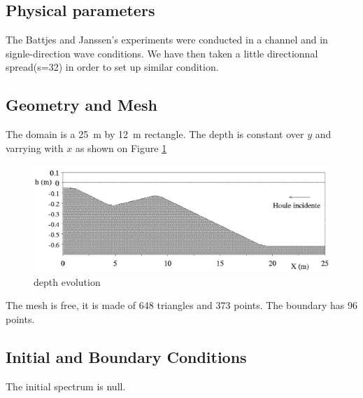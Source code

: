 %
%
%

%
%
\subsection{Physical parameters}
%
The Battjes and Janssen's experiments were conducted in a channel and in
signle-direction wave conditions. We have then taken a little directionnal
spread(s=32) in order to set up similar condition.

%
%
\subsection{Geometry and Mesh}
%
The domain is a 25~m by 12~m rectangle. The depth is constant over $y$ and
varrying with $x$ as shown on Figure \ref{bathybj}

\begin{figure} [!h]
\centering
\includegraphics[scale = 0.8]{bathy.png}
 \caption{depth evolution}
\label{bathybj}
\end{figure}

The mesh is free, it is made of 648 triangles and 373 points. The boundary has
96 points.
%
%
\subsection{Initial and Boundary Conditions}
The initial spectrum is null.


